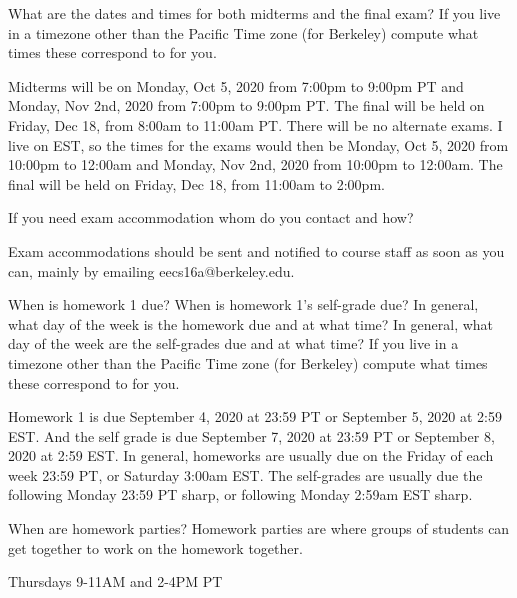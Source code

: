 \documentclass[11pt]{article}
\begin{document}
\begin{Parts}
	\Part What are the dates and times for both midterms and the final exam? If you live in a timezone other than the Pacific Time zone (for Berkeley) compute what times these correspond to for you.
	\begin{Answer}
		Midterms will be on Monday, Oct 5, 2020 from 7:00pm to 9:00pm PT and Monday, Nov 2nd, 2020 from 7:00pm to 9:00pm PT. The final will be held on Friday, Dec 18, from 8:00am to 11:00am PT. There will be no alternate exams. 
		\newline I live on EST, so the times for the exams would then be Monday, Oct 5, 2020 from 10:00pm to 12:00am and Monday, Nov 2nd, 2020 from 10:00pm to 12:00am. The final will be held on Friday, Dec 18, from 11:00am to 2:00pm.
	\end{Answer}
	
	\Part If you need exam accommodation whom do you contact and how?
	\begin{Answer}
		Exam accommodations should be sent and notified to course staff as soon as you can, mainly by emailing  eecs16a@berkeley.edu.
	\end{Answer}
	
	\Part When is homework 1 due? When is homework 1’s self-grade due? In general, what day of the week is the homework due and at what time? In general, what day of the week are the self-grades due and at what time? If you live in a timezone other than the Pacific Time zone (for Berkeley) compute what times these correspond to for you.
	\begin{Answer}
		Homework 1 is due September 4, 2020 at 23:59 PT or September 5, 2020 at 2:59 EST. And the self grade is due September 7, 2020 at 23:59 PT or September 8, 2020 at 2:59 EST. 
		\newline In general, homeworks are usually due on the Friday of each week 23:59 PT, or Saturday 3:00am EST. The self-grades are usually due the following Monday 23:59 PT sharp, or following Monday 2:59am EST sharp.
	\end{Answer}
	
	\Part When are homework parties? Homework parties are where groups of students can get together to work on the homework together.
	\begin{Answer}
		Thursdays 9-11AM and 2-4PM PT
	\end{Answer}
	

\end{Parts}
\end{document}
